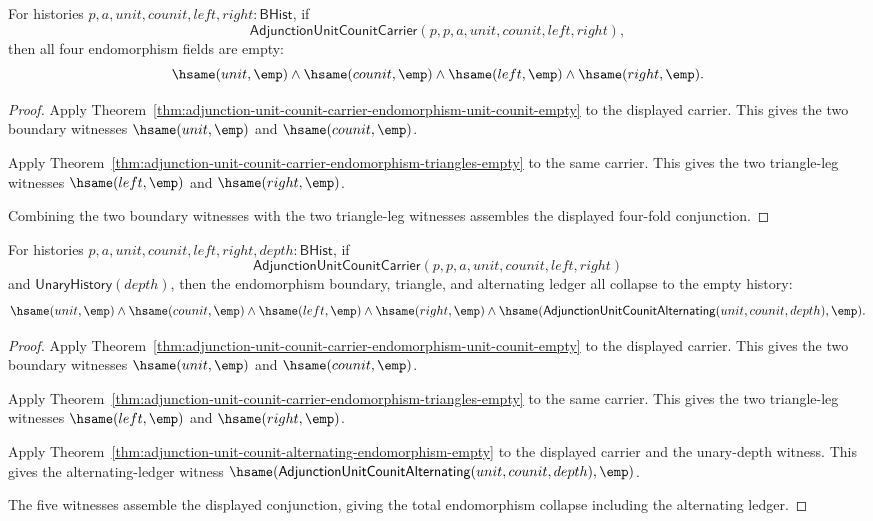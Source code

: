 \begin{theorem}
\label{thm:adjunction-unit-counit-endomorphism-total-collapse}
For histories $p,a,unit,counit,left,right:\mathsf{BHist}$, if
$$
\mathsf{AdjunctionUnitCounitCarrier}(p,p,a,unit,counit,left,right),
$$
then all four endomorphism fields are empty:
$$
\hsame(unit,\emp)\land\hsame(counit,\emp)\land\hsame(left,\emp)\land\hsame(right,\emp).
$$
\end{theorem}
\begin{proof}
Apply Theorem~\ref{thm:adjunction-unit-counit-carrier-endomorphism-unit-counit-empty}
to the displayed carrier. This gives the two boundary witnesses
$\hsame(unit,\emp)$ and $\hsame(counit,\emp)$.

Apply Theorem~\ref{thm:adjunction-unit-counit-carrier-endomorphism-triangles-empty}
to the same carrier. This gives the two triangle-leg witnesses
$\hsame(left,\emp)$ and $\hsame(right,\emp)$.

Combining the two boundary witnesses with the two triangle-leg witnesses
assembles the displayed four-fold conjunction.
\end{proof}

\begin{theorem}
\label{thm:adjunction-unit-counit-endomorphism-total-alternating-collapse}
For histories $p,a,unit,counit,left,right,depth:\mathsf{BHist}$, if
$$
\mathsf{AdjunctionUnitCounitCarrier}(p,p,a,unit,counit,left,right)
$$
and $\mathsf{UnaryHistory}(depth)$, then the endomorphism boundary,
triangle, and alternating ledger all collapse to the empty history:
$$
\hsame(unit,\emp)\land\hsame(counit,\emp)\land
\hsame(left,\emp)\land\hsame(right,\emp)\land
\hsame(\mathsf{AdjunctionUnitCounitAlternating}(unit,counit,depth),\emp).
$$
\end{theorem}
\begin{proof}
Apply Theorem~\ref{thm:adjunction-unit-counit-carrier-endomorphism-unit-counit-empty}
to the displayed carrier. This gives the two boundary witnesses
$\hsame(unit,\emp)$ and $\hsame(counit,\emp)$.

Apply Theorem~\ref{thm:adjunction-unit-counit-carrier-endomorphism-triangles-empty}
to the same carrier. This gives the two triangle-leg witnesses
$\hsame(left,\emp)$ and $\hsame(right,\emp)$.

Apply Theorem~\ref{thm:adjunction-unit-counit-alternating-endomorphism-empty}
to the displayed carrier and the unary-depth witness. This gives the
alternating-ledger witness
$\hsame(\mathsf{AdjunctionUnitCounitAlternating}(unit,counit,depth),\emp)$.

The five witnesses assemble the displayed conjunction, giving the total
endomorphism collapse including the alternating ledger.
\end{proof}


